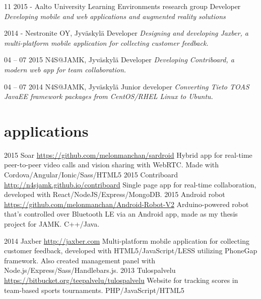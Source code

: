 \documentclass[]{friggeri-cv}
\begin{document}
\begin{entrylist}
  \entry
    {11 2015 - }
    {Aalto University Learning Environments research group}
    {Developer}
    {\emph{Developing mobile and web applications and augmented reality solutions}}

  \entry
    {2014 - }
    {Nestronite OY, Jyväskylä}
    {Developer}
    {\emph{Designing and developing Jaxber, a multi-platform mobile application for collecting customer feedback.}}
    
    \entry
    {04 – 07 2015}
    {N4S@JAMK, Jyväskylä}
    {Developer}
    {\emph{Developing Contriboard, a modern web app for team collaboration.}}
  
  \entry
    {04 – 07 2014}
    {N4S@JAMK, Jyväskylä}
    {Junior developer}
    {\emph{Converting Tieto TOAS JavaEE framework packages from CentOS/RHEL Linux to Ubuntu.}}
    
\end{entrylist}

\section{applications}

\begin{entrylist}
  \entry
    {2015}
    {Soar}
    {\href{https://github.com/melonmanchan/sardroid}{https://github.com/melonmanchan/sardroid}}
    {Hybrid app for real-time peer-to-peer video calls and vision sharing with WebRTC. Made with Cordova/Angular/Ionic/Sass/HTML5}
  \entry
    {2015}
    {Contriboard}
    {\href{http://n4sjamk.github.io/contriboard/}{http://n4sjamk.github.io/contriboard}}
    {Single page app for real-time collaboration, developed with React/NodeJS/Express/MongoDB.}
  \entry
    {2015}
    {Android robot}
    {\href{https://github.com/melonmanchan/Android-Robot-V2}{https://github.com/melonmanchan/Android-Robot-V2}}
    {Arduino-powered robot that's controlled over Bluetooth LE via an Android app, made as my thesis project for JAMK. C++/Java.}

  \entry
    {2014}
    {Jaxber}
    {\href{http://jaxber.com}{http://jaxber.com}}
    {Multi-platform mobile application for collecting customer feedback, developed with HTML5/JavaScript/LESS utilizing PhoneGap framework. Also created management panel with Node.js/Express/Sass/Handlebars.js.}
  \entry
    {2013}
    {Tulospalvelu}
    {\href{https://bitbucket.org/teepalvelu/tulospalvelu}{https://bitbucket.org/teepalvelu/tulospalvelu}}
    {Website for tracking scores in team-based sports tournaments. PHP/JavaScript/HTML5}
\end{entrylist}
\end{document}
